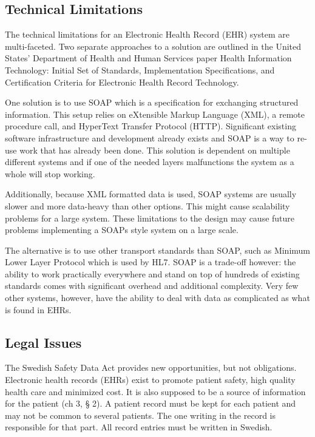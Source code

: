 \documentclass[14pt]{article}
\begin{document}
\subsection{Technical Limitations}
\label{sec:futureTechnical}
The technical limitations for an Electronic Health Record (EHR) system are multi-faceted. Two separate approaches to a solution are outlined in the United States’ Department of Health and Human Services paper Health Information Technology: Initial Set of Standards, Implementation Specifications, and Certification Criteria for Electronic Health Record Technology. \cite{AMA} 

One solution is to use \gls{SOAP} which is a specification for exchanging structured information. This setup relies on eXtensible Markup Language (XML), a remote procedure call, and HyperText Transfer Protocol (HTTP). Significant existing software infrastructure and development already exists and SOAP is a way to re-use work that has already been done. This solution is dependent on multiple different systems and if one of the needed layers malfunctions the system as a whole will stop working. 

Additionally, because XML formatted data is used, SOAP systems are usually slower and more data-heavy than other options. This might cause scalability problems for a large system. These limitations to the design may cause future problems implementing a \glspl{SOAP} style system on a large scale.

The alternative is to use other transport standards than SOAP, such as Minimum Lower Layer Protocol which is used by HL7. SOAP is a trade-off however: the ability to work practically everywhere and stand on top of hundreds of existing standards comes with significant overhead and additional complexity. Very few other systems, however, have the ability to deal with data as complicated as what is found in EHRs.

\subsection{Legal Issues}
\label{sec:futureLegal}
The Swedish Safety Data Act provides new opportunities, but not obligations. \cite{RiR19} Electronic health records (EHRs) exist to promote patient safety, high quality health care and minimized cost. It is also supposed to be a source of information for the patient (ch 3, § 2). A patient record must be kept for each patient and may not be common to several patients. The one writing in the record is responsible for that part. All record entries must be written in Swedish. \cite{PatientDataAct}
\end{document}
